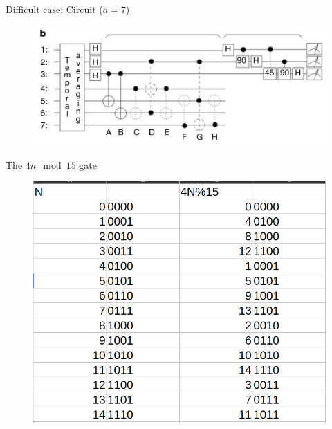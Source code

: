 \documentclass{beamer}
\begin{document}
\begin{frame}{Difficult case: Circuit ($a=7$)}

\begin{figure}[h]
	\centering
	\includegraphics[width=\linewidth]{./figs/7cirucit.png}
\end{figure}
	
\end{frame}

\begin{frame}{The $4n \mod 15$ gate}
	\begin{figure}[h]
		\centering
		\includegraphics[width=0.6\linewidth]{./figs/times4.png}
	\end{figure}
\end{frame}
\end{document}
